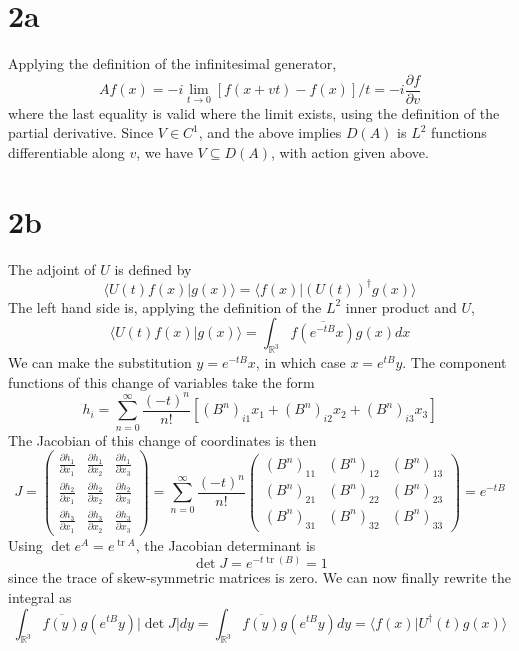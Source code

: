 \documentclass{article}
\DeclareMathOperator{\tr}{tr}
\begin{document}
\section*{2a}
Applying the definition of the infinitesimal generator,
\[
  Af(x)=-i\lim_{t\to 0}[f(x+vt)-f(x)]/t = -i\frac{\partial f}{\partial v}
\]
where the last equality is valid where the limit exists, using the definition of the partial derivative.
Since $V\in C^1$, and the above implies $D(A)$ is $L^2$ functions differentiable along $v$, we have $V\subseteq D(A)$, with action given above.

\section*{2b}
The adjoint of $U$ is defined by
\[
  \langle U(t)f(x) | g(x) \rangle = \langle f(x) | \left( U(t) \right)^{\dagger}g(x) \rangle
\]
The left hand side is, applying the definition of the $L^{2}$ inner product and $U$,
\[
  \langle U(t)f(x)|g(x) \rangle = \int_{\mathbb{R}^{3}} \overline{f(e^{-tB}x)}g(x)dx
\]
We can make the substitution $y=e^{-tB}x$, in which case $x=e^{tB}y$.
The component functions of this change of variables take the form
\[
  h_{i}=\sum_{n=0}^{\infty}\frac{(-t)^{n}}{n!}\left[\left(B^{n}\right)_{i1}x_{1}+\left(B^{n}\right)_{i2}x_{2}+\left(B^{n}\right)_{i3}x_{3}\right]
\]
The Jacobian of this change of coordinates is then
\[
  J=
  \begin{pmatrix}
    \frac{\partial h_{1}}{\partial x_{1}} & \frac{\partial h_{1}}{\partial x_{2}} & \frac{\partial h_{1}}{\partial x_{3}} \\
    \frac{\partial h_{2}}{\partial x_{1}} & \frac{\partial h_{2}}{\partial x_{2}} & \frac{\partial h_{2}}{\partial x_{3}} \\
    \frac{\partial h_{3}}{\partial x_{1}} & \frac{\partial h_{3}}{\partial x_{2}} & \frac{\partial h_{3}}{\partial x_{3}}
  \end{pmatrix}
  =
  \sum_{n=0}^{\infty}\frac{(-t)^{n}}{n!}
  \begin{pmatrix}
    (B^{n})_{11} & (B^{n})_{12} & (B^{n})_{13} \\
    (B^{n})_{21} & (B^{n})_{22} & (B^{n})_{23} \\
    (B^{n})_{31} & (B^{n})_{32} & (B^{n})_{33}
  \end{pmatrix}
  =e^{-tB}
\]
Using $\det e^{A}=e^{\tr A}$, the Jacobian determinant is
\[
  \det J = e^{-t\tr(B)}=1
\]
since the trace of skew-symmetric matrices is zero.
We can now finally rewrite the integral as
\[
  \int_{\mathbb{R}^{3}}\overline{f(y)}g(e^{tB}y)|\det J|dy=  \int_{\mathbb{R}^{3}}\overline{f(y)}g(e^{tB}y)dy
  =\langle f(x)|U^{\dagger}(t)g(x) \rangle
\]
\end{document}

